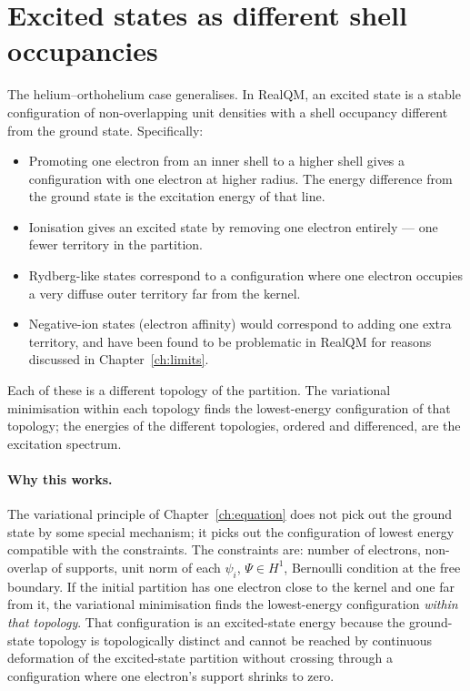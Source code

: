 \section{Excited states as different shell occupancies}\label{sec:excited-as-shells}

The helium--orthohelium case generalises. In RealQM, an excited state is a stable configuration of non-overlapping unit densities with a shell occupancy different from the ground state. Specifically:
\begin{itemize}
\item Promoting one electron from an inner shell to a higher shell gives a configuration with one electron at higher radius. The energy difference from the ground state is the excitation energy of that line.
\item Ionisation gives an excited state by removing one electron entirely --- one fewer territory in the partition.
\item Rydberg-like states correspond to a configuration where one electron occupies a very diffuse outer territory far from the kernel.
\item Negative-ion states (electron affinity) would correspond to adding one extra territory, and have been found to be problematic in RealQM for reasons discussed in Chapter~\ref{ch:limits}.
\end{itemize}
Each of these is a different topology of the partition. The variational minimisation within each topology finds the lowest-energy configuration of that topology; the energies of the different topologies, ordered and differenced, are the excitation spectrum.

\paragraph{Why this works.}
The variational principle of Chapter~\ref{ch:equation} does not pick out the ground state by some special mechanism; it picks out the configuration of lowest energy compatible with the constraints. The constraints are: number of electrons, non-overlap of supports, unit norm of each $\psi_i$, $\Psi \in H^1$, Bernoulli condition at the free boundary. If the initial partition has one electron close to the kernel and one far from it, the variational minimisation finds the lowest-energy configuration \emph{within that topology}. That configuration is an excited-state energy because the ground-state topology is topologically distinct and cannot be reached by continuous deformation of the excited-state partition without crossing through a configuration where one electron's support shrinks to zero.

